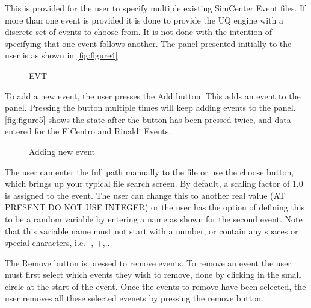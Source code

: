This is provided for the user to specify multiple existing SimCenter
Event files.  If more than one event is provided it is done to provide
the UQ engine with a discrete set of events to choose from.  It is not
done with the intention of specifying that one event follows another.
The panel presented initially to the user is as shown
in \autoref{fig:figure4}.

\begin{figure}[!htbp]
  \caption{EVT}
  \label{fig:figure4}
\end{figure}

To add a new event, the user presses the Add button. 
This adds an event to the panel. 
Pressing the button multiple times will keep adding events to the panel. 
\autoref{fig:figure5} shows the state after the button has been pressed twice, 
and data entered for the ElCentro and Rinaldi Events.

\begin{figure}[!htbp]
  \caption{Adding new event}
  \label{fig:figure5}
\end{figure}


The user can enter the full path manually to the file or use the choose button, 
which brings up your typical file search screen. 
By default, a scaling factor of 1.0 is assigned to the event. 
The user can change this to another real value (AT PRESENT DO NOT USE INTEGER) or the user 
has the option of defining this to be a random variable by entering a name as shown for the second event. 
Note that this variable name must not start with a number, or contain any spaces or special characters, i.e. -, +,..

The Remove button is pressed to remove events. To remove an event the user must first select
which events they wish to remove, done by clicking in the small circle at the start of the event. Once the events to remove 
have been selected, the user removes all these selected evenets by pressing the remove button.

